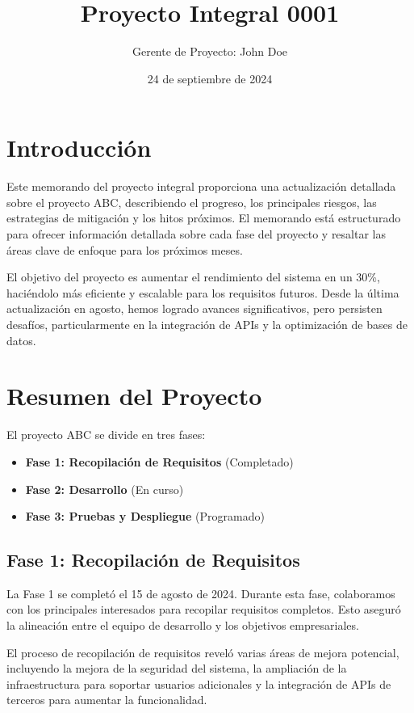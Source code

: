 \documentclass[12pt]{article}
\title{Proyecto Integral 0001}
\author{Gerente de Proyecto: John Doe}
\date{24 de septiembre de 2024}
\begin{document}
\maketitle

\tableofcontents
\newpage

\section{Introducción}
Este memorando del proyecto integral proporciona una actualización detallada sobre el proyecto ABC, describiendo el progreso, los principales riesgos, las estrategias de mitigación y los hitos próximos. El memorando está estructurado para ofrecer información detallada sobre cada fase del proyecto y resaltar las áreas clave de enfoque para los próximos meses.

El objetivo del proyecto es aumentar el rendimiento del sistema en un 30\%, haciéndolo más eficiente y escalable para los requisitos futuros. Desde la última actualización en agosto, hemos logrado avances significativos, pero persisten desafíos, particularmente en la integración de APIs y la optimización de bases de datos.

\section{Resumen del Proyecto}
El proyecto ABC se divide en tres fases:
\begin{itemize}
    \item \textbf{Fase 1: Recopilación de Requisitos} (Completado)
    \item \textbf{Fase 2: Desarrollo} (En curso)
    \item \textbf{Fase 3: Pruebas y Despliegue} (Programado)
\end{itemize}

\subsection{Fase 1: Recopilación de Requisitos}
La Fase 1 se completó el 15 de agosto de 2024. Durante esta fase, colaboramos con los principales interesados para recopilar requisitos completos. Esto aseguró la alineación entre el equipo de desarrollo y los objetivos empresariales.

El proceso de recopilación de requisitos reveló varias áreas de mejora potencial, incluyendo la mejora de la seguridad del sistema, la ampliación de la infraestructura para soportar usuarios adicionales y la integración de APIs de terceros para aumentar la funcionalidad.
\end{document}
